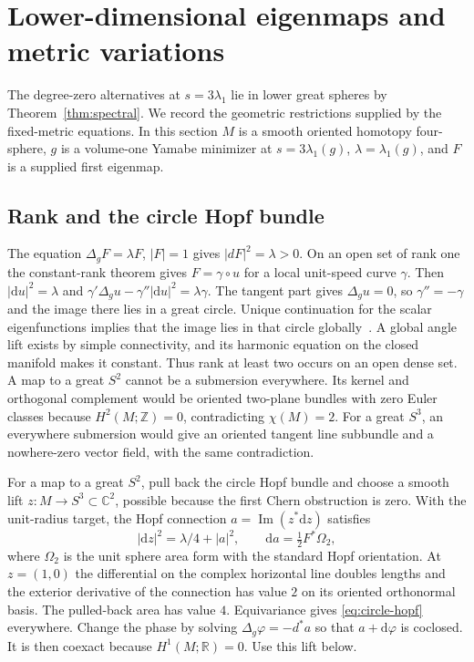 \documentclass[11pt]{article}
\numberwithin{equation}{section}
\newcommand{\dd}{\mathrm{d}}
\newcommand{\RR}{\mathbb{R}}
\newcommand{\abs}[1]{\lvert #1\rvert}
\begin{document}
\section{Lower-dimensional eigenmaps and metric variations}
\label{sec:lower}

The degree-zero alternatives at \(s=3\lambda_1\) lie in lower
great spheres by Theorem~\ref{thm:spectral}. We record the
geometric restrictions supplied by the fixed-metric equations.
In this section \(M\) is a smooth oriented homotopy four-sphere,
\(g\) is a volume-one Yamabe minimizer at \(s=3\lambda_1(g)\),
\(\lambda=\lambda_1(g)\), and \(F\) is a supplied first eigenmap.

\subsection{Rank and the circle Hopf bundle}

The equation \(\Delta_g F=\lambda F\), \(\abs F=1\) gives
\(\abs{dF}^2=\lambda>0\). On an open set of rank one the
constant-rank theorem gives \(F=\gamma\circ u\) for a local
unit-speed curve \(\gamma\). Then \(\abs{\dd u}^2=\lambda\)
and
\(\gamma'\Delta_g u-\gamma''\abs{\dd u}^2=\lambda\gamma\).
The tangent part gives \(\Delta_g u=0\), so \(\gamma''=-\gamma\)
and the image there lies in a great circle. Unique continuation
for the scalar eigenfunctions implies that the image lies in
that circle globally~\cite{Aronszajn1957Continuation}.
A global angle lift exists by simple connectivity, and its
harmonic equation on the closed manifold makes it constant.
Thus rank at least two occurs on an open dense set. A map
to a great \(S^2\) cannot be a submersion everywhere. Its
kernel and orthogonal complement would be oriented two-plane
bundles with zero Euler classes because \(H^2(M;\mathbb Z)=0\),
contradicting \(\chi(M)=2\). For a great \(S^3\), an everywhere
submersion would give an oriented tangent line subbundle and
a nowhere-zero vector field, with the same contradiction.

For a map to a great \(S^2\), pull back the circle Hopf bundle and
choose a smooth lift \(z:M\to S^3\subset\mathbb C^2\), possible
because the first Chern obstruction is zero. With the unit-radius
target, the Hopf connection \(a=\operatorname{Im}(z^*\dd z)\)
satisfies
\begin{equation}\label{eq:circle-hopf}
 \abs{\dd z}^2=\lambda/4+\abs a^2,\qquad
 \dd a=\tfrac12F^*\Omega_2 ,
\end{equation}
where \(\Omega_2\) is the unit sphere area form with the standard
Hopf orientation. At \(z=(1,0)\) the differential on the complex
horizontal line doubles lengths and the exterior derivative of
the connection has value \(2\) on its oriented orthonormal basis.
The pulled-back area has value \(4\). Equivariance gives
\eqref{eq:circle-hopf} everywhere. Change the phase by solving
\(\Delta_g\varphi=-d^*a\) so that \(a+\dd\varphi\) is coclosed.
It is then coexact because \(H^1(M;\RR)=0\). Use this lift below.
\end{document}
